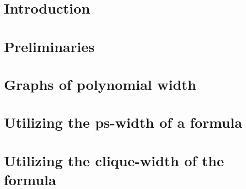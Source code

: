 \documentclass{article}
\begin{document}
\section{Introduction}




\section{Preliminaries}





\section{Graphs of polynomial width}





\section{Utilizing the ps-width of a formula}





\section{Utilizing the clique-width of the formula}






\end{document}
